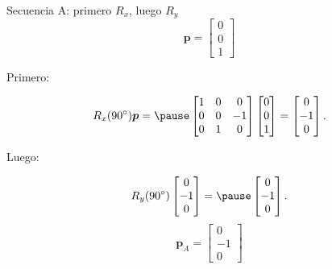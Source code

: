 \documentclass[aspectratio=169,10pt]{beamer}
\begin{document}
\begin{frame}{Secuencia A: primero $R_x$, luego $R_y$}
    \small
    \[
    \boldsymbol{p}=\begin{bmatrix}0\\0\\1\end{bmatrix}
    \]

    Primero:

    \[
    R_x(90^\circ)\boldsymbol{p}
    = \pause
    \begin{bmatrix}
        1&0&0\\
        0&0&-1\\
        0&1&0
    \end{bmatrix}
    \begin{bmatrix}0\\0\\1\end{bmatrix}
    =
    \begin{bmatrix}0\\-1\\0\end{bmatrix}.
    \]

    Luego:

    \[
    R_y(90^\circ)
    \begin{bmatrix}0\\-1\\0\end{bmatrix}
    = \pause
    \begin{bmatrix}0\\-1\\0\end{bmatrix}.
    \]
\vspace{0.2cm}
    \[
    \boxed{\boldsymbol{p}_A=\begin{bmatrix}0\\-1\\0\end{bmatrix}}
    \]
\vspace{-0.2cm}
\pause
\end{frame}
\end{document}
